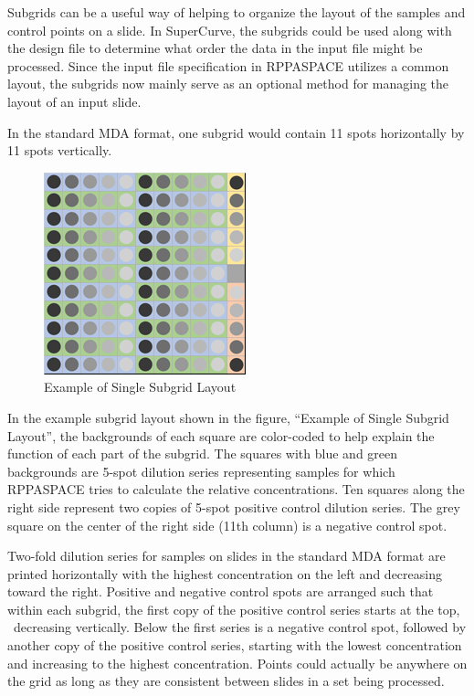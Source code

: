 \documentclass[
]{article}
\begin{document}
Subgrids can be a useful way of helping to organize the layout of the
samples and control points on a slide. In SuperCurve, the subgrids could
be used along with the design file to determine what order the data in
the input file might be processed. Since the input file specification in
RPPASPACE utilizes a common layout, the subgrids now mainly serve as an
optional method for managing the layout of an input slide.

In the standard MDA format, one subgrid would contain 11 spots
horizontally by 11 spots vertically.

\begin{figure}

{\centering \includegraphics[width=0.3\linewidth]{images/single_subgrid} 

}

\caption{Example of Single Subgrid Layout}\label{fig:unnamed-chunk-5}
\end{figure}

In the example subgrid layout shown in the figure, ``Example of Single
Subgrid Layout'', the backgrounds of each square are color-coded to help
explain the function of each part of the subgrid. The squares with blue
and green backgrounds are 5-spot dilution series representing samples
for which RPPASPACE tries to calculate the relative concentrations. Ten
squares along the right side represent two copies of 5-spot positive
control dilution series. The grey square on the center of the right side
(11th column) is a negative control spot.

Two-fold dilution series for samples on slides in the standard MDA
format are printed horizontally with the highest concentration on the
left and decreasing toward the right. Positive and negative control
spots are arranged such that within each subgrid, the first copy of the
positive control series starts at the top, ~decreasing vertically. Below
the first series is a negative control spot, followed by another copy of
the positive control series, starting with the lowest concentration and
increasing to the highest concentration. Points could actually be
anywhere on the grid as long as they are consistent between slides in a
set being processed.
\end{document}
